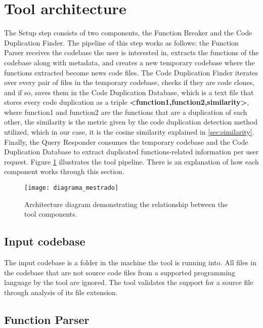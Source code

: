 \en

\section{Tool architecture}
\label{subsec:architecture}

The Setup step consists of two components, the Function Breaker and the Code Duplication Finder. 
The pipeline of this step works as follows: the Function Parser receives the codebase the user 
is interested in, extracts the functions of the codebase along with metadata, and creates a new 
temporary codebase where the functions extracted become news code files. The Code Duplication Finder 
iterates over every pair of files in the temporary codebase, checks if they are code clones, and if 
so, saves them in the Code Duplication Database, which is a text file that stores every code duplication 
as a triple \textbf{<function1,function2,similarity>}, where function1 and function2 are the functions 
that are a duplication of each other, the similarity is the metric given by the code duplication detection 
method utilized, which in our case, it is the cosine similarity explained in \ref{sec:similarity}. 
Finally, the Query Responder consumes the temporary codebase and the Code Duplication Database to 
extract duplicated functions-related information per user request. Figure \ref{fig:diagram} illustrates 
the tool pipeline. There is an explanation of how each component works through this section.

\begin{figure}
\texttt{[image: diagrama\_mestrado]}
\caption{Architecture diagram demonstrating the relationship between the tool components.}
\label{fig:diagram}
\end{figure}

\subsection{Input codebase}

The input codebase is a folder in the machine the tool is running into. All files in the codebase 
that are not source code files from a supported programming language by the tool are ignored. The 
tool validates the support for a source file through analysis of its file extension.

\subsection{Function Parser}

